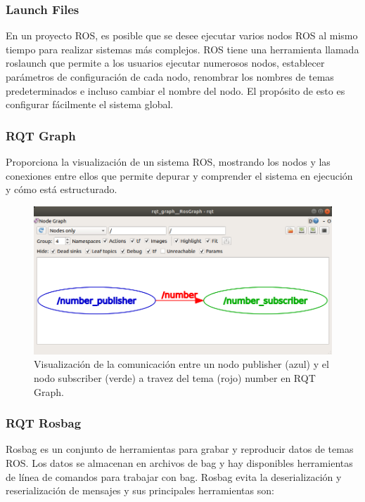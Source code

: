         \subsubsection{Launch Files}
            En un proyecto ROS, es posible que se desee ejecutar varios nodos ROS al mismo tiempo para realizar sistemas más complejos. ROS tiene una herramienta llamada roslaunch que permite a los usuarios ejecutar numerosos nodos, establecer parámetros de configuración de cada nodo, renombrar los nombres de temas predeterminados e incluso cambiar el nombre del nodo. El propósito de esto es configurar fácilmente el sistema global.
            
        \subsubsection{RQT Graph}
            Proporciona la visualización de un sistema ROS, mostrando los nodos y las conexiones entre ellos que permite depurar y comprender el sistema en ejecución y cómo está estructurado. 
            
            \begin{figure}[htb]
                \centering
                \includegraphics[width=1.0\linewidth]{Main/Chapter3/Images3/herramientas_1.png}
                \caption{Visualización de la comunicación entre un nodo publisher (azul) y el nodo subscriber (verde) a travez del tema (rojo) number en RQT Graph.}
                \label{f:Cap3_herramientas_1}
            \end{figure}       
            
            
    \newpage    
    
            \subsubsection{RQT Rosbag}
                Rosbag es un conjunto de herramientas para grabar y reproducir datos de temas ROS. Los datos se almacenan en archivos de bag y hay disponibles herramientas de línea de comandos para trabajar con bag. Rosbag evita la deserialización y reserialización de mensajes y sus principales herramientas son:
                
